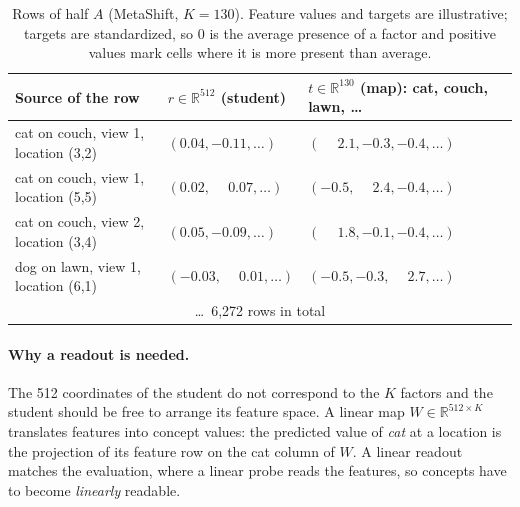 \documentclass{article}
\begin{document}
\begin{table}[htbp]
\centering\small
\caption{Rows of half $A$ (MetaShift, $K=130$). Feature values and targets are illustrative; targets are standardized, so 0 is the average presence of a factor and positive values mark cells where it is more present than average.}
\label{tab:rows}
\footnotesize\setlength{\tabcolsep}{4pt}
\begin{tabular}{lll}
\toprule
Source of the row & $r\in\mathbb{R}^{512}$ (student) & $t\in\mathbb{R}^{130}$ (map): cat, couch, lawn, \ldots \\
\midrule
cat on couch, view 1, location (3,2) & $(0.04,-0.11,\ldots)$ & $(\phantom{-}2.1,-0.3,-0.4,\ldots)$ \\
cat on couch, view 1, location (5,5) & $(0.02,\phantom{-}0.07,\ldots)$ & $(-0.5,\phantom{-}2.4,-0.4,\ldots)$ \\
cat on couch, view 2, location (3,4) & $(0.05,-0.09,\ldots)$ & $(\phantom{-}1.8,-0.1,-0.4,\ldots)$ \\
dog on lawn, view 1, location (6,1) & $(-0.03,\phantom{-}0.01,\ldots)$ & $(-0.5,-0.3,\phantom{-}2.7,\ldots)$ \\
\multicolumn{3}{c}{\ldots\ 6{,}272 rows in total} \\
\bottomrule
\end{tabular}
\end{table}

\paragraph{Why a readout is needed.}
The 512 coordinates of the student do not correspond to the $K$ factors and the student should be free to arrange its feature space. A linear map $W\in\mathbb{R}^{512\times K}$ translates features into concept values: the predicted value of \emph{cat} at a location is the projection of its feature row on the cat column of $W$. A linear readout matches the evaluation, where a linear probe reads the features, so concepts have to become \emph{linearly} readable.
\end{document}

